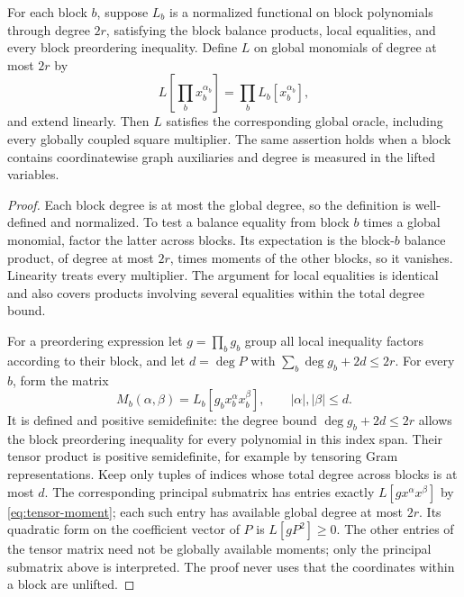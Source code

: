\begin{lemma}
\label{lem:tensor-preordering}
For each block $b$, suppose $L_b$ is a normalized functional on block
polynomials through degree $2r$, satisfying the block balance products,
local equalities, and every block preordering inequality. Define $L$ on
global monomials of degree at most $2r$ by
\begin{equation}\label{eq:tensor-moment}
 L\left[\prod_b x_b^{\alpha_b}\right]=
             \prod_b L_b[x_b^{\alpha_b}],
\end{equation}
and extend linearly. Then $L$ satisfies the corresponding global oracle,
including every globally coupled square multiplier.
The same assertion holds when a block contains coordinatewise graph
auxiliaries and degree is measured in the lifted variables.
\end{lemma}
\begin{proof}
Each block degree is at most the global degree, so the definition is
well-defined and normalized. To test a balance equality from block $b$
times a global monomial, factor the latter across blocks. Its expectation
is the block-$b$ balance product, of degree at most $2r$, times moments
of the other blocks, so it vanishes. Linearity treats every multiplier.
The argument for local equalities is identical and also covers products
involving several equalities within the total degree bound.

For a preordering expression let $g=\prod_b g_b$ group all local
inequality factors according to their block, and let $d=\deg P$ with
$\sum_b\deg g_b+2d\le2r$. For every $b$, form the matrix
\[
 M_b(\alpha,\beta)=L_b[g_b x_b^\alpha x_b^\beta],
 \qquad |\alpha|,|\beta|\le d.
\]
It is defined and positive semidefinite: the degree bound
$\deg g_b+2d\le2r$ allows the block preordering inequality for every
polynomial in this index span. Their tensor product is positive
semidefinite, for example by tensoring Gram representations.
Keep only tuples of indices whose total degree across blocks is at most
$d$. The corresponding principal submatrix has entries exactly
$L[gx^\alpha x^\beta]$ by \eqref{eq:tensor-moment}; each such entry has
available global degree at most $2r$. Its quadratic form on the
coefficient vector of $P$ is $L[gP^2]\ge0$.
The other entries of the tensor matrix need not be globally available
moments; only the principal submatrix above is interpreted. The proof
never uses that the coordinates within a block are unlifted.
\end{proof}

